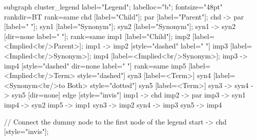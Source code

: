 \documentclass{article}
\begin{document}
{subgraph cluster_legend {
    label="Legend";
    labelloc="b";
    fontsize="48pt"
    rankdir=BT
    {
        rank=same
        chd [label="Child"];
        par [label="Parent"];
        chd -> par [label="                "];
        syn1 [label="Synonym"];
        syn2 [label="Synonym"];
        syn1 -> syn2 [dir=none label="                "];
    }
    {
        rank=same
        imp1 [label="Child"];
        imp2 [label=<Implied<br/>Parent>];
        imp1 -> imp2 [style="dashed" label="                "]
        imp3 [label=<Implied<br/>Synonym>];
        imp4 [label=<Implied<br/>Synonym>];
        imp3 -> imp4 [style="dashed" dir=none label="                "]
    }
    {
        rank=same
        imp5 [label=<Implied<br/>Term> style="dashed"]
        syn3 [label=<Term>]
        syn4 [label=<Synonym<br/>to Both> style="dotted"]
        syn5 [label=<Term>]
        syn3 -> syn4 -> syn5 [dir=none]
    }
    edge [style="invis"]
    imp1 -> chd
    imp2 -> par
    imp3 -> syn1
    imp4 -> syn2
imp5 -> imp1
syn3 -> imp2
syn4 -> imp3
syn5 -> imp4
}

// Connect the dummy node to the first node of the legend
start -> chd [style="invis"];
}
\end{document}

